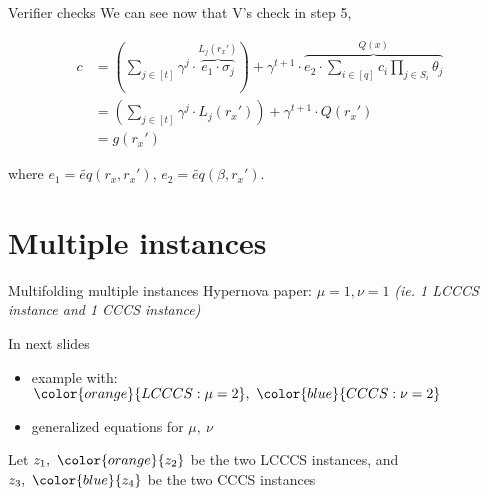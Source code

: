 \documentclass{beamer}
\begin{document}
\begin{tiny}
\begin{frame}{Verifier checks}
We can see now that V's check in step 5,

\begin{align*}
  c &= 
\left( \sum_{j \in [t]} \gamma^j \cdot \overbrace{e_1 \cdot \sigma_j}^{L_j(r_x')} \right) + \gamma^{t+1} \cdot \overbrace{e_2 \cdot \sum_{i \in [q]} c_i \prod_{j \in S_i} \theta_j}^{Q(x)}\\
&= \left( \sum_{j \in [t]} \gamma^j \cdot L_j(r_x') \right) + \gamma^{t+1} \cdot Q(r_x')\\
&= g(r_x')
\end{align*}

where $e_1 = \widetilde{eq}(r_x, r_x')$, $e_2=\widetilde{eq}(\beta, r_x')$.
\end{frame}
\end{tiny}

\section[Multiple instances]{Multiple instances}

\begin{footnotesize}
\begin{frame}{Multifolding multiple instances}
Hypernova paper: $\mu=1, \nu=1$ \emph{(ie. 1 LCCCS instance and 1 CCCS instance)}

\vspace{1cm}
In next slides
\begin{itemize}
  \item example with: $\color{orange}{LCCCS: \mu = 2},~ \color{blue}{CCCS: \nu = 2}$
  \item generalized equations for $\mu,~\nu$
\end{itemize}

Let $z_1,~ \color{orange}{z_2}$ be the two LCCCS instances, and $z_3,~ \color{blue}{z_4}$ be the two CCCS instances

\end{frame}
\end{footnotesize}
\end{document}
